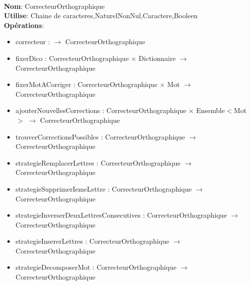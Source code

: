 \documentclass{article}
\begin{document}
    \noindent
    \\
    \textbf{Nom}: CorrecteurOrthographique \\
    \textbf{Utilise}: Chaine de caracteres,NaturelNonNul,Caractere,Booleen \\
    \textbf{Opérations}: \begin{itemize}[label=$\ $, leftmargin=2cm, itemsep=0cm]
        \item correcteur : $\rightarrow$ CorrecteurOrthographique
        
        \item fixerDico : CorrecteurOrthographique $\times$ Dictionnaire $\rightarrow$ CorrecteurOrthographique
        \item fixerMotACorriger : CorrecteurOrthographique $\times$ Mot $\rightarrow$ CorrecteurOrthographique
        \item ajouterNouvellesCorrections : CorrecteurOrthographique $\times$ Ensemble$<$Mot$>$ $\rightarrow$ CorrecteurOrthographique
        \item trouverCorrectionsPossibles : CorrecteurOrthographique $\rightarrow$ CorrecteurOrthographique
        \item strategieRemplacerLettres : CorrecteurOrthographique $\rightarrow$ CorrecteurOrthographique
        \item strategieSupprimerIemeLettre : CorrecteurOrthographique $\rightarrow$ CorrecteurOrthographique
        \item strategieInverserDeuxLettresConsecutives : CorrecteurOrthographique $\rightarrow$ CorrecteurOrthographique
        \item strategieInsererLettres : CorrecteurOrthographique $\rightarrow$ CorrecteurOrthographique
        \item strategieDecomposerMot : CorrecteurOrthographique $\rightarrow$ CorrecteurOrthographique
    \end{itemize}
\end{document}
